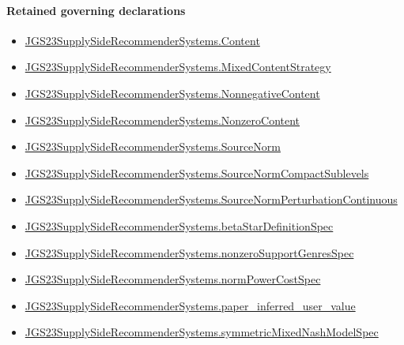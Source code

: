 \documentclass[10pt]{article}
\begin{document}
\paragraph{Retained governing declarations}
\begin{itemize}\raggedright
\item \hyperlink{governing-declaration-367305fda50f0ada}{JGS23\allowbreak{}Supply\allowbreak{}Side\allowbreak{}Recommender\allowbreak{}Systems.\allowbreak{}Content}
\item \hyperlink{governing-declaration-2089965d06cf0282}{JGS23\allowbreak{}Supply\allowbreak{}Side\allowbreak{}Recommender\allowbreak{}Systems.\allowbreak{}Mixed\allowbreak{}Content\allowbreak{}Strategy}
\item \hyperlink{governing-declaration-d426babe40b9593c}{JGS23\allowbreak{}Supply\allowbreak{}Side\allowbreak{}Recommender\allowbreak{}Systems.\allowbreak{}Nonnegative\allowbreak{}Content}
\item \hyperlink{governing-declaration-90e2ac7d13788c50}{JGS23\allowbreak{}Supply\allowbreak{}Side\allowbreak{}Recommender\allowbreak{}Systems.\allowbreak{}Nonzero\allowbreak{}Content}
\item \hyperlink{governing-declaration-6141339a5d3412d9}{JGS23\allowbreak{}Supply\allowbreak{}Side\allowbreak{}Recommender\allowbreak{}Systems.\allowbreak{}Source\allowbreak{}Norm}
\item \hyperlink{governing-declaration-0d92048317064110}{JGS23\allowbreak{}Supply\allowbreak{}Side\allowbreak{}Recommender\allowbreak{}Systems.\allowbreak{}Source\allowbreak{}Norm\allowbreak{}Compact\allowbreak{}Sublevels}
\item \hyperlink{governing-declaration-6ccc463be39b315f}{JGS23\allowbreak{}Supply\allowbreak{}Side\allowbreak{}Recommender\allowbreak{}Systems.\allowbreak{}Source\allowbreak{}Norm\allowbreak{}Perturbation\allowbreak{}Continuous}
\item \hyperlink{paper-prerequisite-27ab0f155f5dcf24}{JGS23\allowbreak{}Supply\allowbreak{}Side\allowbreak{}Recommender\allowbreak{}Systems.\allowbreak{}beta\allowbreak{}Star\allowbreak{}Definition\allowbreak{}Spec}
\item \hyperlink{governing-declaration-588c7a0b2af225d7}{JGS23\allowbreak{}Supply\allowbreak{}Side\allowbreak{}Recommender\allowbreak{}Systems.\allowbreak{}nonzero\allowbreak{}Support\allowbreak{}Genres\allowbreak{}Spec}
\item \hyperlink{governing-declaration-6ba13dc1cae95e6e}{JGS23\allowbreak{}Supply\allowbreak{}Side\allowbreak{}Recommender\allowbreak{}Systems.\allowbreak{}norm\allowbreak{}Power\allowbreak{}Cost\allowbreak{}Spec}
\item \hyperlink{governing-declaration-48347eafb3702717}{JGS23\allowbreak{}Supply\allowbreak{}Side\allowbreak{}Recommender\allowbreak{}Systems.\allowbreak{}paper\_\allowbreak{}inferred\_\allowbreak{}user\_\allowbreak{}value}
\item \hyperlink{paper-prerequisite-b412efba7deb757f}{JGS23\allowbreak{}Supply\allowbreak{}Side\allowbreak{}Recommender\allowbreak{}Systems.\allowbreak{}symmetric\allowbreak{}Mixed\allowbreak{}Nash\allowbreak{}Model\allowbreak{}Spec}
\end{itemize}
\end{document}
